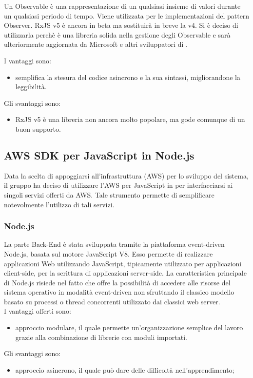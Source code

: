 Un Observable è una rappresentazione di un qualsiasi insieme di valori durante un qualsiasi periodo di tempo. Viene utilizzata per le implementazioni del pattern Observer.
RxJS v5 è ancora in beta ma sostituirà in breve la v4. Si è deciso di utilizzarla perchè è una libreria solida nella gestione degli Observable e sarà ulteriormente aggiornata
da Microsoft e altri sviluppatori di  .

I vantaggi sono:
\begin{itemize}
	\item semplifica la stesura del codice asincrono e la sua sintassi, migliorandone la leggibilità.
\end{itemize}
Gli svantaggi sono:
\begin{itemize}
	\item RxJS v5 è una libreria non ancora molto popolare, ma gode comunque di un buon supporto.
\end{itemize}

\subsection{AWS SDK per JavaScript in Node.js}

Data la scelta di appoggiarsi all'infrastruttura  (AWS) per lo sviluppo del sistema, il gruppo ha deciso di utilizzare l'AWS  per JavaScript in  per
interfacciarsi ai singoli servizi offerti da AWS. Tale strumento permette di semplificare notevolmente l'utilizzo di tali servizi.

\subsubsection{Node.js}
La parte Back-End è stata sviluppata tramite la piattaforma event-driven Node.js, basata sul motore JavaScript V8. Esso permette di realizzare applicazioni Web utilizzando JavaScript, tipicamente utilizzato per applicazioni client-side, per la scrittura di applicazioni server-side. La caratteristica principale di Node.js risiede nel fatto che offre la possibilità di accedere alle risorse del sistema operativo in modalità event-driven non sfruttando il classico modello basato su processi o thread concorrenti utilizzato dai classici web server.\\
I vantaggi offerti sono:
\begin{itemize}
	\item approccio modulare, il quale permette un’organizzazione semplice del lavoro grazie alla combinazione di librerie con moduli importati.
\end{itemize}
Gli svantaggi sono:
\begin{itemize}
	\item approccio asincrono, il quale può dare delle difficoltà nell'apprendimento;
\end{itemize}

